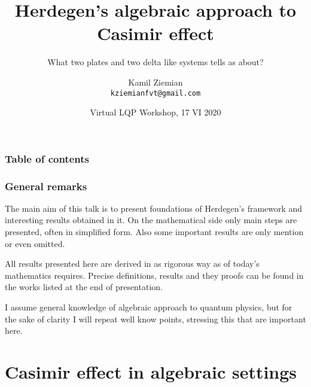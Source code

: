 \documentclass[10pt,t]{beamer}  %
\title{Herdegen's algebraic approach to Casimir effect}
\subtitle{What two plates and two delta like systems tells as about?}
\author{Kamil Ziemian \\
  \texttt{kziemianfvt@gmail.com}}
\institute{Jagiellonian University in~Cracow}
\date[17 June 2020]{Virtual LQP Workshop, 17 VI 2020}
\begin{document}



\maketitle %



\begin{frame}
  \frametitle{Table of contents}


  \tableofcontents %

\end{frame}










\begin{frame}
  \frametitle{General remarks}


  The main aim of this talk is to present foundations of Herdegen's
  framework and interesting results obtained in it. On the
  mathematical side only main steps are presented, often in simplified
  form. Also some important results are only mention or even omitted.

  All results presented here are derived in as rigorous way as of
  today's mathematics requires. Precise definitions, results and they
  proofs can be found in the works listed at the end of presentation.

  I assume general knowledge of algebraic approach to quantum physics,
  but for the sake of clarity I will repeat well know points,
  stressing this that are important here.

\end{frame}









\section{Casimir effect in algebraic settings}
\end{document}
